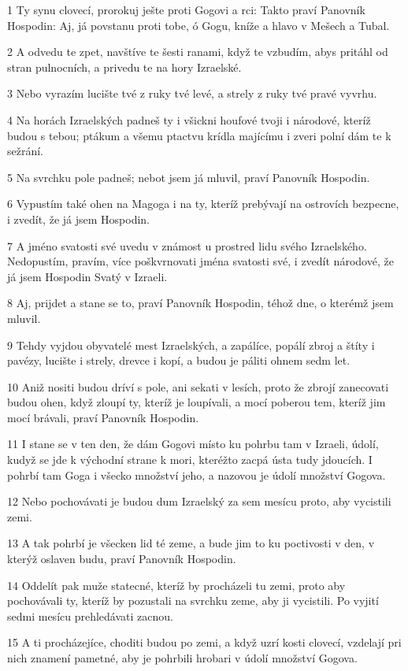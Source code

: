 \par 1 Ty synu clovecí, prorokuj ješte proti Gogovi a rci: Takto praví Panovník Hospodin: Aj, já povstanu proti tobe, ó Gogu, kníže a hlavo v Mešech a Tubal.
\par 2 A odvedu te zpet, navštíve te šesti ranami, když te vzbudím, abys pritáhl od stran pulnocních, a privedu te na hory Izraelské.
\par 3 Nebo vyrazím lucište tvé z ruky tvé levé, a strely z ruky tvé pravé vyvrhu.
\par 4 Na horách Izraelských padneš ty i všickni houfové tvoji i národové, kteríž budou s tebou; ptákum a všemu ptactvu krídla majícímu i zveri polní dám te k sežrání.
\par 5 Na svrchku pole padneš; nebot jsem já mluvil, praví Panovník Hospodin.
\par 6 Vypustím také ohen na Magoga i na ty, kteríž prebývají na ostrovích bezpecne, i zvedít, že já jsem Hospodin.
\par 7 A jméno svatosti své uvedu v známost u prostred lidu svého Izraelského. Nedopustím, pravím, více poškvrnovati jména svatosti své, i zvedít národové, že já jsem Hospodin Svatý v Izraeli.
\par 8 Aj, prijdet a stane se to, praví Panovník Hospodin, téhož dne, o kterémž jsem mluvil.
\par 9 Tehdy vyjdou obyvatelé mest Izraelských, a zapálíce, popálí zbroj a štíty i pavézy, lucište i strely, drevce i kopí, a budou je páliti ohnem sedm let.
\par 10 Aniž nositi budou dríví s pole, ani sekati v lesích, proto že zbrojí zanecovati budou ohen, když zloupí ty, kteríž je loupívali, a mocí poberou tem, kteríž jim mocí brávali, praví Panovník Hospodin.
\par 11 I stane se v ten den, že dám Gogovi místo ku pohrbu tam v Izraeli, údolí, kudyž se jde k východní strane k mori, kteréžto zacpá ústa tudy jdoucích. I pohrbí tam Goga i všecko množství jeho, a nazovou je údolí množství Gogova.
\par 12 Nebo pochovávati je budou dum Izraelský za sem mesícu proto, aby vycistili zemi.
\par 13 A tak pohrbí je všecken lid té zeme, a bude jim to ku poctivosti v den, v kterýž oslaven budu, praví Panovník Hospodin.
\par 14 Oddelít pak muže statecné, kteríž by procházeli tu zemi, proto aby pochovávali ty, kteríž by pozustali na svrchku zeme, aby ji vycistili. Po vyjití sedmi mesícu prehledávati zacnou.
\par 15 A ti procházejíce, choditi budou po zemi, a když uzrí kosti clovecí, vzdelají pri nich znamení pametné, aby je pohrbili hrobari v údolí množství Gogova.
